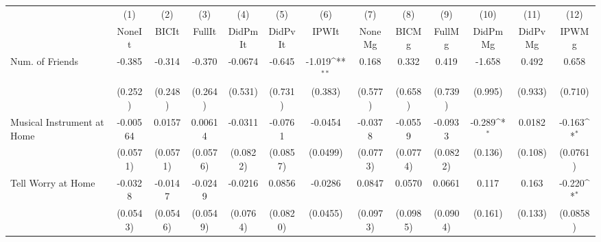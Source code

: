 {
\def\sym#1{\ifmmode^{#1}\else\(^{#1}\)\fi}
\begin{tabular}{l*{12}{c}}
\toprule
            &\multicolumn{1}{c}{(1)}&\multicolumn{1}{c}{(2)}&\multicolumn{1}{c}{(3)}&\multicolumn{1}{c}{(4)}&\multicolumn{1}{c}{(5)}&\multicolumn{1}{c}{(6)}&\multicolumn{1}{c}{(7)}&\multicolumn{1}{c}{(8)}&\multicolumn{1}{c}{(9)}&\multicolumn{1}{c}{(10)}&\multicolumn{1}{c}{(11)}&\multicolumn{1}{c}{(12)}\\
            &\multicolumn{1}{c}{NoneIt}&\multicolumn{1}{c}{BICIt}&\multicolumn{1}{c}{FullIt}&\multicolumn{1}{c}{DidPmIt}&\multicolumn{1}{c}{DidPvIt}&\multicolumn{1}{c}{IPWIt}&\multicolumn{1}{c}{NoneMg}&\multicolumn{1}{c}{BICMg}&\multicolumn{1}{c}{FullMg}&\multicolumn{1}{c}{DidPmMg}&\multicolumn{1}{c}{DidPvMg}&\multicolumn{1}{c}{IPWMg}\\
\midrule
Num. of Friends&      -0.385         &      -0.314         &      -0.370         &     -0.0674         &      -0.645         &      -1.019\sym{**} &       0.168         &       0.332         &       0.419         &      -1.658         &       0.492         &       0.658         \\
            &     (0.252)         &     (0.248)         &     (0.264)         &     (0.531)         &     (0.731)         &     (0.383)         &     (0.577)         &     (0.658)         &     (0.739)         &     (0.995)         &     (0.933)         &     (0.710)         \\
\addlinespace
Musical Instrument at Home&    -0.00564         &      0.0157         &     0.00614         &     -0.0311         &     -0.0761         &     -0.0454         &     -0.0378         &     -0.0559         &     -0.0933         &      -0.289\sym{*}  &      0.0182         &      -0.163\sym{*}  \\
            &    (0.0571)         &    (0.0571)         &    (0.0576)         &    (0.0822)         &    (0.0857)         &    (0.0499)         &    (0.0773)         &    (0.0774)         &    (0.0822)         &     (0.136)         &     (0.108)         &    (0.0761)         \\
\addlinespace
Tell Worry at Home&     -0.0328         &     -0.0147         &     -0.0249         &     -0.0216         &      0.0856         &     -0.0286         &      0.0847         &      0.0570         &      0.0661         &       0.117         &       0.163         &      -0.220\sym{*}  \\
            &    (0.0543)         &    (0.0546)         &    (0.0549)         &    (0.0764)         &    (0.0820)         &    (0.0455)         &    (0.0973)         &    (0.0985)         &    (0.0904)         &     (0.161)         &     (0.133)         &    (0.0858)         \\

\end{tabular}}
